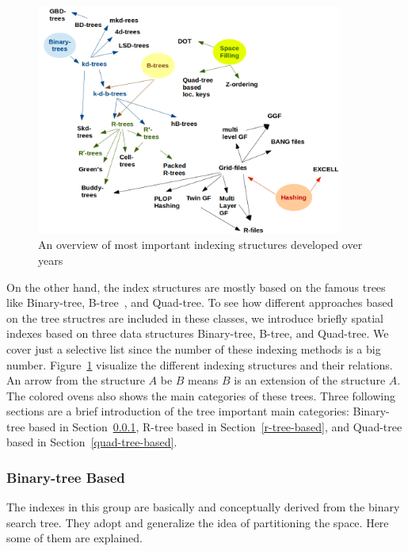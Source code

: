 \documentclass[a4paper,12pt]{article}
\begin{document}
\begin{figure}
\centering
\includegraphics[width=0.9\textwidth]{Trees}
\caption{An overview of most important indexing structures developed over years}
\label{trees}
\end{figure}

On the other hand, the index structures are mostly based on the famous trees like Binary-tree, B-tree~\cite{btree}, and Quad-tree. 
To see how different approaches based on the tree structres are included in these classes,  we introduce briefly spatial indexes based on three data structures Binary-tree, B-tree, and Quad-tree. We cover just a selective list since the number of these indexing methods
is a big number. Figure~\ref{trees} visualize the different indexing structures and their relations. An arrow from the structure $A$
be $B$ means $B$ is an extension of the structure $A$. The colored ovens also shows the main categories of these
trees. Three following sections are a brief introduction of the tree important main categories:
Binary-tree based in Section~\ref{binary-tree-based}, 
R-tree based in Section~\ref{r-tree-based}, 
and Quad-tree based in Section~\ref{quad-tree-based}.

\subsubsection{Binary-tree Based}
\label{binary-tree-based}
The indexes in this group are basically and conceptually derived from the binary search tree. They adopt and generalize the idea of partitioning the space. Here some of them are explained.
\end{document}
